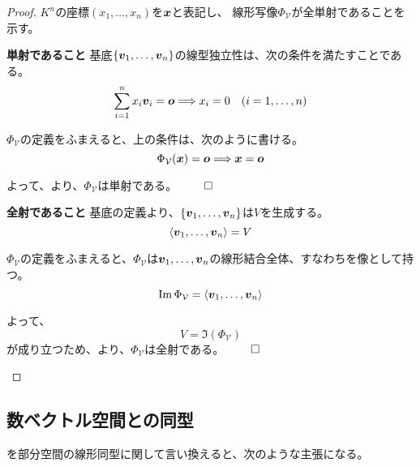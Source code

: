 \documentclass[../../../topic_linear-algebra]{subfiles}
\begin{document}
\begin{proof}
  $K^n$の座標$(x_1,\dots,x_n)$を$\vb*{x}$と表記し、
  線形写像$\Phi_{\mathcal{V}}$が全単射であることを示す。

  \begin{subpattern}{\bfseries 単射であること}
    基底$\{ \vb*{v}_1,\dots, \vb*{v}_n \}$の線型独立性は、次の条件を満たすことである。
    \begin{equation*}
      \sum_{i=1}^n x_i \vb*{v}_i = \vb*{o} \Longrightarrow x_i = 0 \quad (i=1,\dots,n)
    \end{equation*}

    $\Phi_{\mathcal{V}}$の定義をふまえると、上の条件は、次のように書ける。
    \begin{equation*}
      \Phi_{\mathcal{V}}(\vb*{x}) = \vb*{o} \Longrightarrow \vb*{x} = \vb*{o}
    \end{equation*}

    よって、より、$\Phi_{\mathcal{V}}$は単射である。 $\qed$
  \end{subpattern}

  \begin{subpattern}{\bfseries 全射であること}
    基底の定義より、$\{ \vb*{v}_1, \dots, \vb*{v}_n \}$は$V$を生成する。
    \begin{equation*}
      \langle \vb*{v}_1, \dots, \vb*{v}_n \rangle = V
    \end{equation*}
    
    $\Phi_{\mathcal{V}}$の定義をふまえると、$\Phi_{\mathcal{V}}$は$\vb*{v}_1, \dots, \vb*{v}_n$の線形結合全体、すなわちを像として持つ。
    \begin{equation*}
      \Im \Phi_{\mathcal{V}} = \langle \vb*{v}_1, \dots, \vb*{v}_n \rangle
    \end{equation*}
    
    よって、
    \begin{equation*}
      V = \Im(\Phi_{\mathcal{V}})
    \end{equation*}
    が成り立つため、より、$\Phi_{\mathcal{V}}$は全射である。 $\qed$
  \end{subpattern}
\end{proof}

\subsection{数ベクトル空間との同型}

を部分空間の線形同型に関して言い換えると、次のような主張になる。
\end{document}

